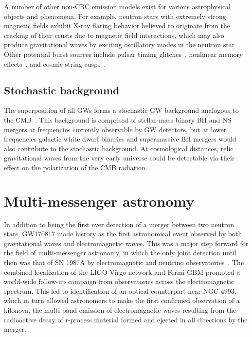 A number of other non-CBC emission models exist for various astrophysical objects and phenomena.
For example, neutron stars with extremely strong magnetic fields exhibit X-ray flaring behavior believed to originate from the cracking of their crusts due to magnetic field interactions, which may also produce gravitational waves by exciting oscillatory modes in the neutron star~\citep{Lasky_2015}.
Other potential burst sources include pulsar timing glitches~\citep{pulsar_s5}, nonlinear memory effects~\citep{memory_o2}, and cosmic string cusps~\citep{strings_o3}.


\subsection{Stochastic background}

The superposition of all \acp{GW} forms a stochastic \ac{GW} background analogous to the \ac{CMB}~\citep{Christensen_2018}.
This background is comprised of stellar-mass binary \ac{BH} and \ac{NS} mergers at frequencies currently observable by \ac{GW} detectors, but at lower frequencies galactic white dwarf binaries and supermassive BH mergers would also contribute to the stochastic background.
At cosmological distances, relic gravitational waves from the very early universe could be detectable via their effect on the polarization of the \ac{CMB} radiation.


\section{Multi-messenger astronomy}\label{sec:mma}

In addition to being the first ever detection of a merger between two neutron stars, GW170817 made history as the first astronomical event observed by both gravitational waves and electromagnetic waves.
This was a major step forward for the field of multi-messenger astronomy, in which the only joint detection until then was that of SN 1987A by electromagnetic and neutrino observatories~\citep{Hirata_1987, Bionta_1987, Alekseev_1988}.
The combined localization of the LIGO-Virgo network and Fermi-GBM prompted a world-wide follow-up campaign from observatories across the electromagnetic spectrum.
This led to identification of an optical counterpart near NGC 4993, which in turn allowed astronomers to make the first confirmed observation of a kilonova, the multi-band emission of electromagnetic waves resulting from the radioactive decay of r-process material formed and ejected in all directions by the merger.

